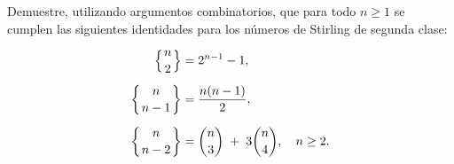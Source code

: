 Demuestre, utilizando argumentos combinatorios, que para todo $n \geq 1$ se cumplen las siguientes identidades para los números de Stirling de segunda clase:


\[
\begin{aligned}
\left\{n \atop 2\right\}
&= 2^{n-1} - 1, \\[6pt]
\left\{n \atop n-1\right\}
&= \frac{n(n-1)}{2}, \\[6pt]
\left\{n \atop n-2\right\}
&= \binom{n}{3} \;+\; 3\binom{n}{4},
\quad n \ge 2.
\end{aligned}
\]
